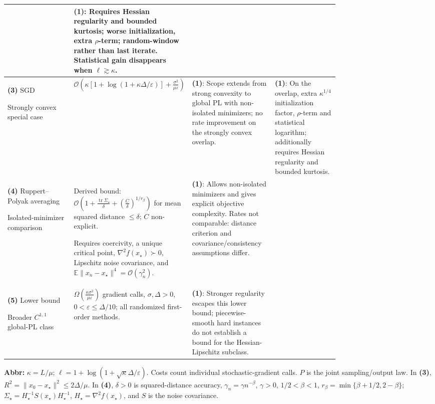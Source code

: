 \begin{table}[tp]
\begin{threeparttable}
\begin{tabularx}{\linewidth}{@{}>{\raggedright\arraybackslash}p{0.20\linewidth}>{\raggedright\arraybackslash}p{0.32\linewidth}>{\raggedright\arraybackslash}p{0.25\linewidth}>{\raggedright\arraybackslash}X@{}}
& \textbf{(1)}: Requires Hessian regularity and bounded kurtosis; worse initialization, extra $\rho$-term; random-window rather than last iterate. Statistical gain disappears when $\ell\gtrsim\kappa$. \\
\midrule
\textbf{(3)} SGD \citep[Thm.~5]{plhkStich2019v2}\par Strongly convex special case
& $\mathcal{O}\!\left(\kappa[1+\log(1+\kappa\Delta/\varepsilon)]+\frac{\sigma^2}{\mu\varepsilon}\right)$
& \textbf{(1)}: Scope extends from strong convexity to global PL with non-isolated minimizers; no rate improvement on the strongly convex overlap.
& \textbf{(1)}: On the overlap, extra $\kappa^{1/4}$ initialization factor, $\rho$-term and statistical logarithm; additionally requires Hessian regularity and bounded kurtosis. \\
\midrule
\textbf{(4)} Ruppert--Polyak averaging \citep[Thm.~2]{plhkGadatPanloup2017v1}\par Isolated-minimizer comparison
& Derived bound: $\mathcal{O}\!\left(1+\frac{\operatorname{tr}\Sigma_\star}{\delta}+\left(\frac C\delta\right)^{1/r_\beta}\right)$ for mean squared distance $\leq\delta$; $C$ non-explicit.\par Requires coercivity, a unique critical point, $\nabla^2f(x_\star)\succ0$, Lipschitz noise covariance, and $\mathbb E\|x_n-x_\star\|^4=\mathcal{O}(\gamma_n^2)$.
& \textbf{(1)}: Allows non-isolated minimizers and gives explicit objective complexity. Rates not comparable: distance criterion and covariance/consistency assumptions differ.
& \\
\midrule
\textbf{(5)} Lower bound \citep[Thm.~4.3, Rem.~4.6]{plhkMasiha2026v3}\par Broader $C^{1,1}$ global-PL class
& $\Omega\!\left(\frac{\kappa\sigma^2}{\mu\varepsilon}\right)$ gradient calls, $\sigma,\Delta>0$, $0<\varepsilon\leq\Delta/10$; all randomized first-order methods.
& \textbf{(1)}: Stronger regularity escapes this lower bound; piecewise-smooth hard instances do not establish a bound for the Hessian-Lipschitz subclass.
& \\
\bottomrule
\end{tabularx}
\begin{tablenotes}[flushleft]\footnotesize
\item[] \textbf{Abbr:} $\kappa=L/\mu$; $\ell=1+\log(1+\sqrt\kappa\Delta/\varepsilon)$. Costs count individual stochastic-gradient calls. $P$ is the joint sampling/output law. In \textbf{(3)}, $R^2=\|x_0-x_\star\|^2\leq2\Delta/\mu$. In \textbf{(4)}, $\delta>0$ is squared-distance accuracy, $\gamma_n=\gamma n^{-\beta}$, $\gamma>0$, $1/2<\beta<1$, $r_\beta=\min\{\beta+1/2,2-\beta\}$; $\Sigma_\star=H_\star^{-1}S(x_\star)H_\star^{-1}$, $H_\star=\nabla^2f(x_\star)$, and $S$ is the noise covariance.
\end{tablenotes}
\end{threeparttable}
\end{table}
\clearpage
